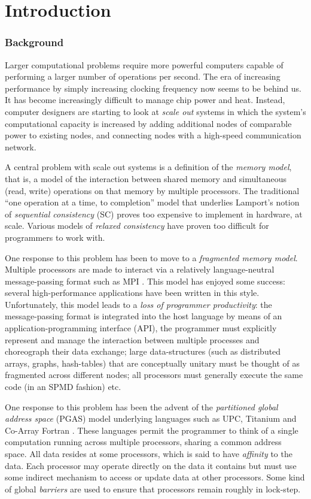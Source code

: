 \chapter{Introduction}

\subsection*{Background}
Larger computational problems require more powerful computers capable of
performing a larger number of operations per second. The era of
increasing performance by simply increasing clocking frequency now
seems to be behind us. It has become increasingly difficult
to manage chip power and heat.  Instead, computer
designers are starting to look at {\em scale out} systems in which the
system's computational capacity is increased by adding additional
nodes of comparable power to existing nodes, and connecting nodes with
a high-speed communication network.

A central problem with scale out systems is a definition of the {\em
memory model}, that is, a model of the interaction between shared
memory and  simultaneous (read, write) operations on that
memory by multiple processors. The traditional ``one operation at a
time, to completion'' model that underlies Lamport's notion of {\em
sequential consistency} (SC) proves too expensive to implement in
hardware, at scale. Various models of {\em relaxed consistency} have
proven too difficult for programmers to work with.  

One response to this problem has been to move to a {\em fragmented
memory model}. Multiple processors are made to interact via a
relatively language-neutral message-passing format such as MPI
\cite{mpi}. This model has enjoyed some success: several
high-performance applications have been written in this
style. Unfortunately, this model leads to a {\em loss of programmer
productivity}: the message-passing format is integrated into the host
language by means of an application-programming interface (API), the
programmer must explicitly represent and manage the interaction
between multiple processes and choreograph their data exchange; large
data-structures (such as distributed arrays, graphs, hash-tables) that
are conceptually unitary must be thought of as fragmented across
different nodes; all processors must generally execute the same code
(in an SPMD fashion) etc.

One response to this problem has been the advent of the {\em
partitioned global address space} (PGAS) model underlying languages
such as UPC, Titanium and Co-Array Fortran \cite{pgas,titanium}. These
languages permit the programmer to think of a single computation
running across multiple processors, sharing a common address
space. All data resides at some processors, which is said to have {\em
affinity} to the data.  Each processor may operate directly on the
data it contains but must use some indirect mechanism to access or
update data at other processors. Some kind of global {\em barriers}
are used to ensure that processors remain roughly in lock-step.

